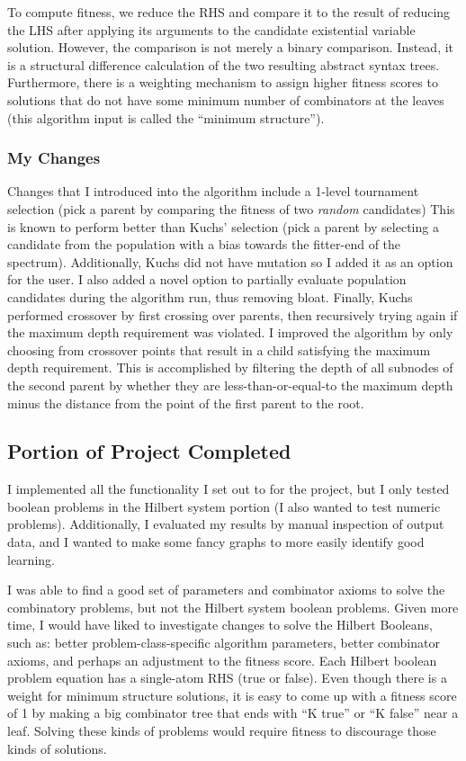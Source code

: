 \documentclass{article}
\begin{document}
To compute fitness, we reduce the RHS and compare it to the result of
reducing the LHS after applying its arguments to the candidate
existential variable solution. However, the comparison is not merely a
binary comparison. Instead, it is a structural difference calculation
of the two resulting abstract syntax trees. Furthermore, there is a
weighting mechanism to assign higher fitness scores to solutions that
do not have some minimum number of combinators at the leaves (this
algorithm input is called the ``minimum structure'').

\subsubsection{My Changes}

Changes that I introduced into the algorithm include a 1-level
tournament selection (pick a parent by comparing the fitness of two
\textit{random} candidates)
This is known to perform better than Kuchs' selection (pick a parent
by selecting a candidate from the population with a bias towards the
fitter-end of the spectrum).
Additionally, Kuchs did not have mutation so I added it as an option
for the user.
I also added a novel option to partially evaluate population
candidates during the algorithm run, thus removing bloat. Finally,
Kuchs performed crossover by first crossing over parents, then
recursively trying again if the maximum depth requirement was
violated. I improved the algorithm by only choosing from crossover
points that result in a child satisfying the maximum depth
requirement. This is accomplished by filtering the depth of all
subnodes of the second parent by whether they are
less-than-or-equal-to the maximum depth minus the distance from the
point of the first parent to the root.

\subsection{Portion of Project Completed}

I implemented all the functionality I set out to for the project, but
I only tested boolean problems in the Hilbert system portion (I also wanted to
test numeric problems). Additionally, I
evaluated my results by manual inspection of output data, and I wanted
to make some fancy graphs to more easily identify good learning.

I was able to find a good set of parameters and combinator axioms to solve the
combinatory problems, but not the Hilbert system boolean problems.
Given more time, I would have liked to investigate changes to solve
the Hilbert Booleans, such as: better problem-class-specific algorithm
parameters, better combinator axioms, and perhaps an adjustment to the
fitness score. Each Hilbert boolean problem equation has a single-atom
RHS (true or false). Even though there is a weight for minimum
structure solutions, it is easy to come up with a fitness score of 1
by making a big combinator tree that ends with
``K true'' or ``K false'' near a leaf. Solving these kinds of problems
would require fitness to discourage those kinds of solutions.
\end{document}
